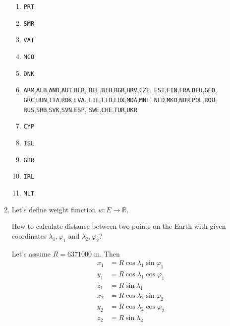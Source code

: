 \documentclass[12pt, a4paper]{article}
\begin{document}
\begin{enumerate}[label=\alph*)]
\begin{enumerate}
\item \texttt{PRT}
\item \texttt{SMR}
\item \texttt{VAT}
\item \texttt{MCO}
\item \texttt{DNK}
\item \texttt{ARM},\texttt{ALB},\texttt{AND},\texttt{AUT},\texttt{BLR},
      \texttt{BEL},\texttt{BIH},\texttt{BGR},\texttt{HRV},\texttt{CZE},
      \texttt{EST},\texttt{FIN},\texttt{FRA},\texttt{DEU},\texttt{GEO},
      \texttt{GRC},\texttt{HUN},\texttt{ITA},\texttt{ROK},\texttt{LVA},
      \texttt{LIE},\texttt{LTU},\texttt{LUX},\texttt{MDA},\texttt{MNE},
      \texttt{NLD},\texttt{MKD},\texttt{NOR},\texttt{POL},\texttt{ROU},
      \texttt{RUS},\texttt{SRB},\texttt{SVK},\texttt{SVN},\texttt{ESP},
      \texttt{SWE},\texttt{CHE},\texttt{TUR},\texttt{UKR}
\item \texttt{CYP}
\item \texttt{ISL}
\item \texttt{GBR}
\item \texttt{IRL}
\item \texttt{MLT}
\end{enumerate}

\item Let's define weight function \(w : E \to \mathbb{R}\).

How to calculate distance between two points on the Earth with given coordinates \(\lambda_1, \varphi_1\) and \(\lambda_2, \varphi_2\)?

Let's assume \(R = 6371000\) m. Then
\begin{align*}
x_1 &= R\cos\lambda_1\sin\varphi_1 \\
y_1 &= R\cos\lambda_1\cos\varphi_1 \\
z_1 &= R\sin\lambda_1 \\
x_2 &= R\cos\lambda_2\sin\varphi_2 \\
y_2 &= R\cos\lambda_2\cos\varphi_2 \\
z_2 &= R\sin\lambda_2
\end{align*}


\end{enumerate}
\end{document}
